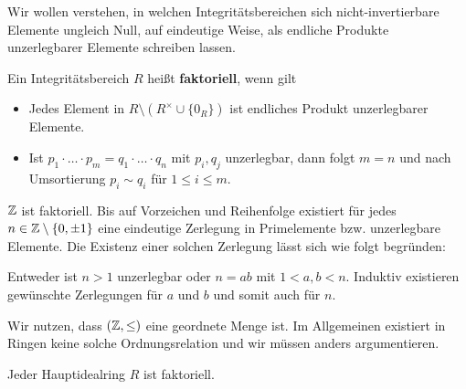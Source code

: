 Wir wollen verstehen, in welchen Integritätsbereichen sich nicht-invertierbare Elemente ungleich Null, auf eindeutige Weise, als endliche Produkte unzerlegbarer Elemente schreiben lassen. 
\begin{definition}
	Ein Integritätsbereich $R$ heißt \textbf{faktoriell}, wenn gilt
	\begin{itemize}
		\item Jedes Element in $R \setminus (R^\times \cup \{0_R\})$ ist endliches Produkt unzerlegbarer Elemente.
		\item Ist $p_1 \cdot \hdots \cdot p_m = q_1 \cdot \hdots \cdot q_n$ mit $p_i, q_j$ unzerlegbar, dann folgt $m = n$ und nach Umsortierung $p_i \sim q_i$ für $1 \leq i \leq m$.
	\end{itemize}
\end{definition}
\begin{beispiel}\label{beispiel6_12}
	$\mathbb{Z}$ ist faktoriell. Bis auf Vorzeichen und Reihenfolge existiert für jedes $n \in \mathbb{Z} \setminus \{0, \pm1\}$ eine eindeutige Zerlegung in Primelemente bzw. unzerlegbare Elemente. Die Existenz einer solchen Zerlegung lässt sich wie folgt begründen:
	
	Entweder ist $n > 1$ unzerlegbar oder $n = ab$ mit $1 < a,b < n$. Induktiv existieren gewünschte Zerlegungen für $a$ und $b$ und somit auch für $n$. 
	
	Wir nutzen, dass $(\mathbb{Z}, \leq)$ eine geordnete Menge ist. Im Allgemeinen existiert in Ringen keine solche Ordnungsrelation und wir müssen anders argumentieren.
\end{beispiel}
\begin{satz}\label{satz6_13}
	Jeder Hauptidealring $R$ ist faktoriell.
\end{satz}
